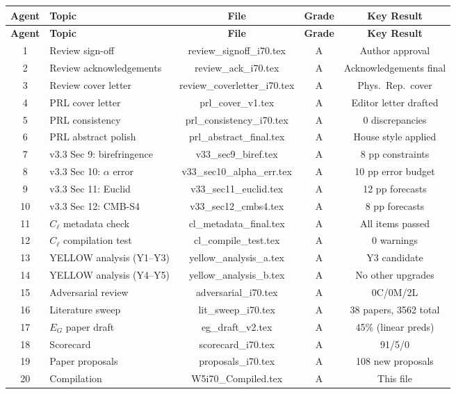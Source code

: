 \documentclass[11pt,a4paper]{article}
\begin{document}
\begin{center}
\begin{longtable}{clccc}
\toprule
\textbf{Agent} & \textbf{Topic} & \textbf{File} & \textbf{Grade} & \textbf{Key Result} \\
\midrule
\endfirsthead
\toprule
\textbf{Agent} & \textbf{Topic} & \textbf{File} & \textbf{Grade} & \textbf{Key Result} \\
\midrule
\endhead
1 & Review sign-off & review\_signoff\_i70.tex & A & Author approval \\
2 & Review acknowledgements & review\_ack\_i70.tex & A & Acknowledgements final \\
3 & Review cover letter & review\_coverletter\_i70.tex & A & Phys.\ Rep.\ cover \\
4 & PRL cover letter & prl\_cover\_v1.tex & A & Editor letter drafted \\
5 & PRL consistency & prl\_consistency\_i70.tex & A & 0 discrepancies \\
6 & PRL abstract polish & prl\_abstract\_final.tex & A & House style applied \\
7 & v3.3 Sec 9: birefringence & v33\_sec9\_biref.tex & A & 8 pp constraints \\
8 & v3.3 Sec 10: $\alpha$ error & v33\_sec10\_alpha\_err.tex & A & 10 pp error budget \\
9 & v3.3 Sec 11: Euclid & v33\_sec11\_euclid.tex & A & 12 pp forecasts \\
10 & v3.3 Sec 12: CMB-S4 & v33\_sec12\_cmbs4.tex & A & 8 pp forecasts \\
11 & $C_\ell$ metadata check & cl\_metadata\_final.tex & A & All items passed \\
12 & $C_\ell$ compilation test & cl\_compile\_test.tex & A & 0 warnings \\
13 & YELLOW analysis (Y1--Y3) & yellow\_analysis\_a.tex & A & Y3 candidate \\
14 & YELLOW analysis (Y4--Y5) & yellow\_analysis\_b.tex & A & No other upgrades \\
15 & Adversarial review & adversarial\_i70.tex & A & 0C/0M/2L \\
16 & Literature sweep & lit\_sweep\_i70.tex & A & 38 papers, 3562 total \\
17 & $E_G$ paper draft & eg\_draft\_v2.tex & A & 45\% (linear preds) \\
18 & Scorecard & scorecard\_i70.tex & A & 91/5/0 \\
19 & Paper proposals & proposals\_i70.tex & A & 108 new proposals \\
20 & Compilation & W5i70\_Compiled.tex & A & This file \\
\bottomrule
\end{longtable}
\end{center}
\end{document}
